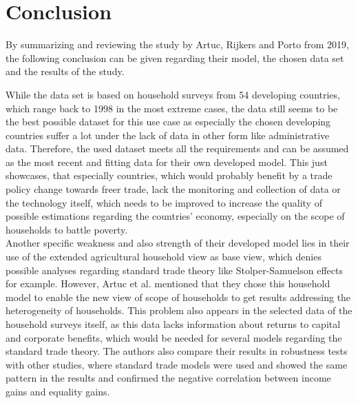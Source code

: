 \chapter{Conclusion}

By summarizing and reviewing the study by Artuc, Rijkers and Porto from 2019, the following conclusion can be given regarding
their model, the chosen data set and the results of the study.

While the data set is based on household surveys from 54 developing countries, which range back to 1998 in the most extreme
cases, the data still seems to be the best possible dataset for this use case as especially the chosen developing countries
suffer a lot under the lack of data in other form like administrative data. Therefore, the used dataset meets all the requirements
and can be assumed as the most recent and fitting data for their own developed model. This just showcases, that especially
countries, which would probably benefit by a trade policy change towards freer trade, lack the monitoring and collection of
data or the technology itself, which needs to be improved to increase the quality of possible estimations regarding the 
countries' economy, especially on the scope of households to battle poverty.\\

Another specific weakness and also strength of their developed model lies in their use of the extended agricultural household
view as base view, which denies possible analyses regarding standard trade theory like Stolper-Samuelson effects for example.
However, Artuc et al. mentioned that they chose this household model to enable the new view of scope of households to get 
results addressing the heterogeneity of households. This problem also appears in the selected data of the household surveys 
itself, as this data lacks information about returns to capital and corporate benefits, which would be needed for several 
models regarding the standard trade theory. The authors also compare their results in robustness tests with other studies, 
where standard trade models were used and showed the same pattern in the results and confirmed the negative correlation between
income gains and equality gains.\\

